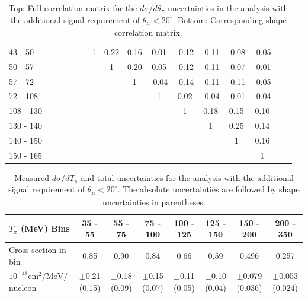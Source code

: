 \begin{table}[h]
\begin{tabular}{l|ccccccccccccccc}
43 - 50 &  &  &  &  &  & 1 & 0.22 & 0.16 & 0.01 & -0.12 & -0.11 & -0.08 & -0.05 \\  
50 - 57 &  &  &  &  &  &  & 1 & 0.20 & 0.05 & -0.12 & -0.11 & -0.07 & -0.01 \\ 
57 - 72 &  &  &  &  &  &  &  & 1 & -0.04 & -0.14 & -0.11 & -0.11 & -0.05 \\ 
72 - 108 &  &  &  &  &  &  &  &  & 1 & 0.02 & -0.04 & -0.01 & -0.04 \\ 
108 - 130 &  &  &  &  &  &  &  &  &  & 1 & 0.18 & 0.15 & 0.10 \\ 
130 - 140 &  &  &  &  &  &  &  &  &  &  & 1 & 0.25 & 0.14 \\ 
140 - 150 &  &  &  &  &  &  &  &  &  &  &  & 1 & 0.16 \\ 
150 - 165 &  &  &  &  &  &  &  &  &  &  &  &  & 1 \\ 
\hline\hline
\end{tabular}
\caption{Top:  Full correlation matrix for the $d\sigma / d\theta_\pi$ uncertainties in the \cconepi analysis with the additional signal requirement of $\theta_\mu < 20^\circ$.  Bottom: Corresponding shape correlation matrix.} 
\end{table}
\endgroup

\clearpage
\begingroup
\squeezetable
\begin{table}[h]
\begin{tabular}{l|ccccccc}
\hline\hline
$T_{\pi}$ (MeV) Bins & 35 - 55 & 55 - 75 & 75 - 100 & 100 - 125 & 125 - 150 & 150 - 200 & 200 - 350 \\ 
\hline
Cross section in bin & 0.85 & 0.90 & 0.84 & 0.66 & 0.59 & 0.496 & 0.257 \\ 
$10^{-41}\mathrm{cm}^2/\mathrm{MeV}/$nucleon &  $\pm$0.21 (0.15) &  $\pm$0.18 (0.09) &  $\pm$0.15 (0.07) &  $\pm$0.11 (0.05) &  $\pm$0.10 (0.04) &  $\pm$0.079 (0.036) &  $\pm$0.053 (0.024) \\ 
\hline\hline
\end{tabular}
\caption{Measured $d\sigma / dT_\pi$ and total uncertainties for the \cconepi analysis with the additional signal requirement of $\theta_\mu < 20^\circ$.  The absolute uncertainties are followed by shape uncertainties in parentheses.}
\end{table}
\endgroup

